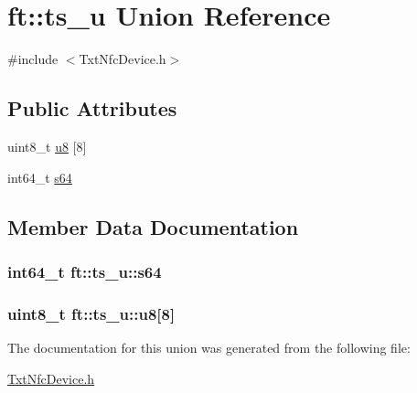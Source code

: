\hypertarget{unionft_1_1ts__u}{}\section{ft\+:\+:ts\+\_\+u Union Reference}
\label{unionft_1_1ts__u}


{\ttfamily \#include $<$Txt\+Nfc\+Device.\+h$>$}

\subsection*{Public Attributes}
\begin{DoxyCompactItemize}
\item 
uint8\+\_\+t \hyperlink{unionft_1_1ts__u_a2bd6e7eefdc25ffe6105540f7cbb8022}{u8} \mbox{[}8\mbox{]}
\item 
int64\+\_\+t \hyperlink{unionft_1_1ts__u_a3f0ddb56ec7ef6f9ee1d75e89a968a9a}{s64}
\end{DoxyCompactItemize}


\subsection{Member Data Documentation}
\subsubsection[{\texorpdfstring{s64}{s64}}]{\setlength{\rightskip}{0pt plus 5cm}int64\+\_\+t ft\+::ts\+\_\+u\+::s64}\hypertarget{unionft_1_1ts__u_a3f0ddb56ec7ef6f9ee1d75e89a968a9a}{}\label{unionft_1_1ts__u_a3f0ddb56ec7ef6f9ee1d75e89a968a9a}
\subsubsection[{\texorpdfstring{u8}{u8}}]{\setlength{\rightskip}{0pt plus 5cm}uint8\+\_\+t ft\+::ts\+\_\+u\+::u8\mbox{[}8\mbox{]}}\hypertarget{unionft_1_1ts__u_a2bd6e7eefdc25ffe6105540f7cbb8022}{}\label{unionft_1_1ts__u_a2bd6e7eefdc25ffe6105540f7cbb8022}


The documentation for this union was generated from the following file\+:\begin{DoxyCompactItemize}
\item 
\hyperlink{_txt_nfc_device_8h}{Txt\+Nfc\+Device.\+h}\end{DoxyCompactItemize}

